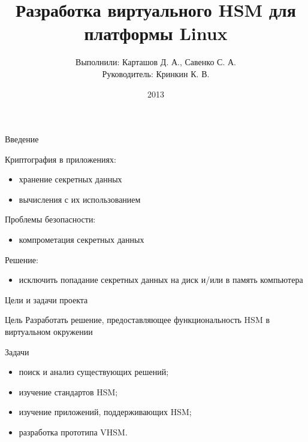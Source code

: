\documentclass[utf8, 11pt]{beamer}
\author[ ]{Выполнили: Карташов Д. А., Савенко С. А. \\ Руководитель: Кринкин К. В.}
\title[Virtual HSM]{Разработка виртуального HSM для платформы Linux}
\institute[СПбАУ]
{
  Кафедра математических и информационных технологий\\
  Санкт-Петербургский Академический университет
}
\date{ 2013 }
\begin{document}
\begin{frame}
  \titlepage
\end{frame}

\begin{frame}{Введение}

Криптография в приложениях:
\begin{itemize}
\item хранение секретных данных
\item вычисления с их использованием
\end{itemize}

\vspace*{\fill}

Проблемы безопасности:
\begin{itemize}
\item компрометация секретных данных
\end{itemize}

\vspace*{\fill}

Решение:
\begin{itemize}
\item исключить попадание секретных данных на диск и/или в память компьютера
\end{itemize}

\vspace*{\fill}

\end{frame}

\begin{frame}{Цели и задачи проекта}

\begin{block}{Цель}
Разработать решение, предоставляющее функциональность HSM в виртуальном окружении
\end{block}

\vspace*{\fill}

\begin{block}{Задачи}
\begin{itemize}
\item поиск и анализ существующих решений;
\item изучение стандартов HSM;
\item изучение приложений, поддерживающих HSM;
\item разработка прототипа VHSM.
\end{itemize}
\end{block}

\end{frame}
\end{document}
